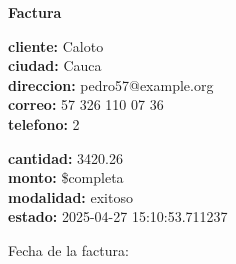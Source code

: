 \documentclass{article}
\begin{document}
\begin{center}
    {\LARGE \textbf{Factura}}\\[1cm]
\end{center}

\textbf{cliente:} Caloto \\
\textbf{ciudad:} Cauca \\
\textbf{direccion:} pedro57@example.org \\
\textbf{correo:} 57 326 110 07 36 \\
\textbf{telefono:} 2 \\

\vspace{0.5cm}

\textbf{cantidad:} 3420.26 \\
\textbf{monto:} \$completa \\
\textbf{modalidad:} exitoso \\
\textbf{estado:} 2025-04-27 15:10:53.711237 \\

\vspace{1cm}

Fecha de la factura: 
\end{document}
